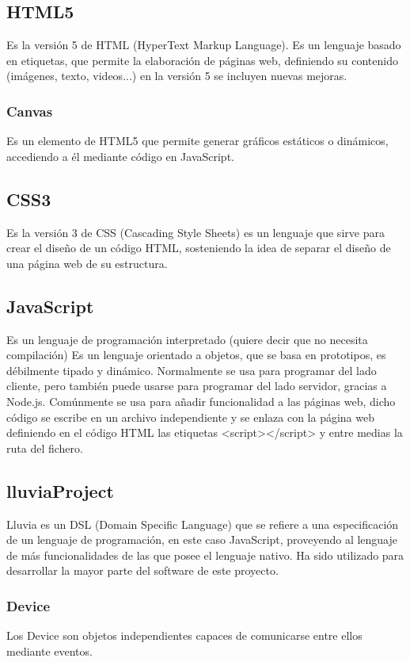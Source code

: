 \documentclass[a4paper,10pt]{article}
\begin{document}
\subsection{HTML5}
Es la versión 5 de HTML (HyperText Markup Language). Es un lenguaje basado en etiquetas,
que permite la elaboración de páginas web, definiendo su contenido (imágenes, texto,
videos...) en la versión 5 se incluyen nuevas mejoras.

\subsubsection{Canvas}
Es un elemento de HTML5 que permite generar gráficos estáticos o dinámicos, accediendo a él
mediante código en JavaScript.

\subsection{CSS3}
Es la versión 3 de CSS (Cascading Style Sheets) es un lenguaje que sirve para crear el diseño de
un código HTML, sosteniendo la idea de separar el diseño de una página web de su estructura. 

\subsection{JavaScript}
Es un lenguaje de programación interpretado (quiere decir que no necesita compilación) Es un
lenguaje orientado a objetos, que se basa en prototipos, es débilmente tipado y dinámico.
Normalmente se usa para programar del lado cliente, pero también puede usarse para
programar del lado servidor, gracias a Node.js. Comúnmente se usa para añadir funcionalidad
a las páginas web, dicho código se escribe en un archivo independiente y se enlaza con la
página web definiendo en el código HTML las etiquetas <script></script> y entre medias la
ruta del fichero.

\subsection{lluviaProject}
Lluvia es un DSL (Domain Specific Language) que se refiere a una especificación de un
lenguaje de programación, en este caso JavaScript, proveyendo al lenguaje de más
funcionalidades de las que posee el lenguaje nativo. Ha sido utilizado para desarrollar la
mayor parte del software de este proyecto.

\subsubsection{Device}
Los Device son objetos independientes capaces de comunicarse entre ellos mediante eventos.
\end{document}
